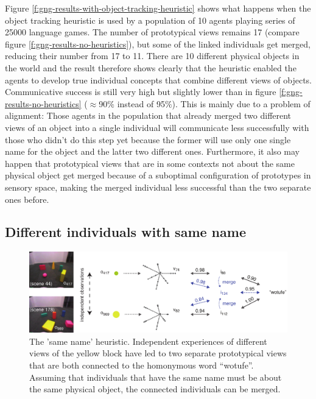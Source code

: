 Figure \ref{f:gng-results-with-object-tracking-heuristic} shows what
happens when the object tracking heuristic is used by a population of
10 agents playing series of 25000 language games. The number of
prototypical views remains 17 (compare figure
\ref{f:gng-results-no-heuristics}), but some of the linked individuals
get merged, reducing their number from 17 to 11. There are 10
different physical objects in the world and the result therefore shows
clearly that the heuristic enabled the agents to develop true
individual concepts that combine different views of objects.
Communicative success is still very high but slightly lower than in
figure \ref{f:gng-results-no-heuristics} ($\approx$90$\%$ instead of
95$\%$). This is mainly due to a problem of alignment: Those agents in
the population that already merged two different views of an object
into a single individual will communicate less successfully with those
who didn't do this step yet because the former will use only one
single name for the object and the latter two different
ones. Furthermore, it also may happen that prototypical views that are
in some contexts not about the same physical object get merged because
of a suboptimal configuration of prototypes in sensory space, making
the merged individual less successful than the two separate ones
before.

\subsection{Different individuals with same name}

\begin{figure}[t]
  \includegraphics[width=1\textwidth]{figures/gng-heuristic-homonymy}
  \caption{The 'same name' heuristic. Independent experiences of
    different views of the yellow block have led to two separate
    prototypical views that are both connected to the homonymous word
    ``wotufe''. Assuming that individuals that have the same name must
    be about the same physical object, the connected individuals can be
    merged.}
  \label{f:gng-heuristic-homonymy}
\end{figure}

